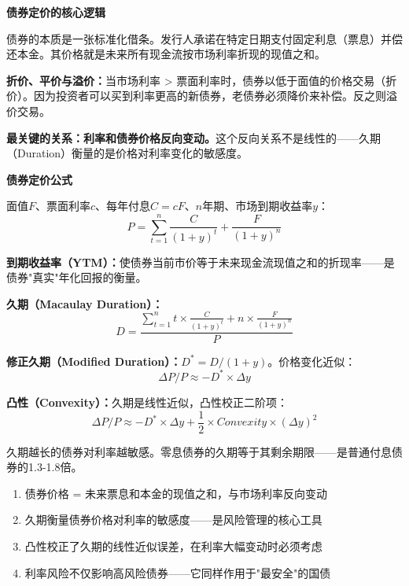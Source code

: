 \documentclass[a4paper,11pt]{ctexbook}
\begin{document}
\begin{qualitative}
\textbf{债券定价的核心逻辑}

债券的本质是一张标准化借条。发行人承诺在特定日期支付固定利息（票息）并偿还本金。其价格就是未来所有现金流按市场利率折现的现值之和。

\textbf{折价、平价与溢价：}当市场利率 > 票面利率时，债券以低于面值的价格交易（折价）。因为投资者可以买到利率更高的新债券，老债券必须降价来补偿。反之则溢价交易。

\textbf{最关键的关系：利率和债券价格反向变动。}这个反向关系不是线性的——久期（Duration）衡量的是价格对利率变化的敏感度。
\end{qualitative}

\begin{quantitative}
\textbf{债券定价公式}

面值$F$、票面利率$c$、每年付息$C = cF$、$n$年期、市场到期收益率$y$：
\[
P = \sum_{t=1}^{n} \frac{C}{(1+y)^t} + \frac{F}{(1+y)^n}
\]

\textbf{到期收益率（YTM）：}使债券当前市价等于未来现金流现值之和的折现率——是债券"真实"年化回报的衡量。

\textbf{久期（Macaulay Duration）：}
\[
D = \frac{\sum_{t=1}^{n} t \times \frac{C}{(1+y)^t} + n \times \frac{F}{(1+y)^n}}{P}
\]

\textbf{修正久期（Modified Duration）：}$D^* = D / (1+y)$。价格变化近似：
\[
\Delta P / P \approx -D^* \times \Delta y
\]

\textbf{凸性（Convexity）：}久期是线性近似，凸性校正二阶项：
\[
\Delta P / P \approx -D^* \times \Delta y + \frac{1}{2} \times Convexity \times (\Delta y)^2
\]

久期越长的债券对利率越敏感。零息债券的久期等于其剩余期限——是普通付息债券的1.3-1.8倍。
\end{quantitative}

\begin{lessonsummary}
\begin{enumerate}
  \item 债券价格 = 未来票息和本金的现值之和，与市场利率反向变动
  \item 久期衡量债券价格对利率的敏感度——是风险管理的核心工具
  \item 凸性校正了久期的线性近似误差，在利率大幅变动时必须考虑
  \item 利率风险不仅影响高风险债券——它同样作用于"最安全"的国债
\end{enumerate}
\end{lessonsummary}
\end{document}
